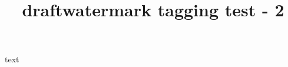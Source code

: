 \documentclass{article}
\title{draftwatermark tagging test - 2}
\begin{document}
text
\end{document}
